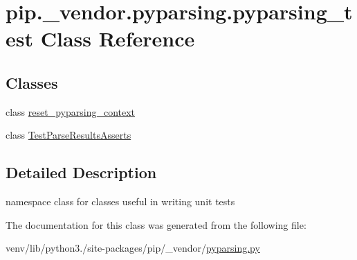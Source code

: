 \hypertarget{classpip_1_1__vendor_1_1pyparsing_1_1pyparsing__test}{}\section{pip.\+\_\+vendor.\+pyparsing.\+pyparsing\+\_\+test Class Reference}
\label{classpip_1_1__vendor_1_1pyparsing_1_1pyparsing__test}
\subsection*{Classes}
\begin{DoxyCompactItemize}
\item 
class \hyperlink{classpip_1_1__vendor_1_1pyparsing_1_1pyparsing__test_1_1reset__pyparsing__context}{reset\+\_\+pyparsing\+\_\+context}
\item 
class \hyperlink{classpip_1_1__vendor_1_1pyparsing_1_1pyparsing__test_1_1TestParseResultsAsserts}{Test\+Parse\+Results\+Asserts}
\end{DoxyCompactItemize}


\subsection{Detailed Description}
\begin{DoxyVerb}namespace class for classes useful in writing unit tests
\end{DoxyVerb}
 

The documentation for this class was generated from the following file\+:\begin{DoxyCompactItemize}
\item 
venv/lib/python3./site-\/packages/pip/\+\_\+vendor/\hyperlink{pip_2__vendor_2pyparsing_8py}{pyparsing.\+py}\end{DoxyCompactItemize}
